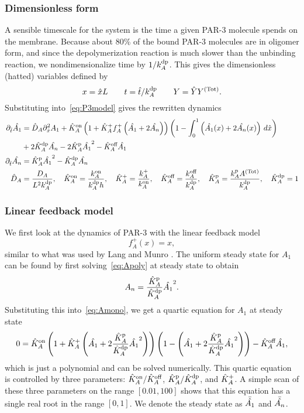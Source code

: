 \documentclass[11pt]{article}
\newcommand{\6}[1]{#1_{\text{6}}}
\newcommand{\3}[1]{#1_{\text{3}}}
\newcommand{\Tot}[1]{#1^\text{(Tot)}}
\newcommand{\A}[1]{#1_A}
\begin{document}
\subsubsection{Dimensionless form}
A sensible timescale for the system is the time a given PAR-3 molecule spends on the membrane. Because about 80\% of the bound PAR-3 molecules are in oligomer form, and since the depolymerization reaction is much slower than the unbinding reaction, we nondimensionalize time by $1/\A{\kdp}$. This gives the dimensionless (hatted) variables defined by
\begin{equation*}
x = \hat{x} L \qquad t= \hat{t}/\A{\kdp} \qquad Y= \hat{Y}\Tot{Y}.
\end{equation*}
Substituting into\ \eqref{eq:P3model} gives the rewritten dynamics
\begin{subequations}
\label{eq:PAR3gen}
\begin{align}
\nonumber
\Dthat \hat{\MA} & = \DhatA \Dxhat^2 \MA +\KhatonA \left(1+\KhatfA \A{f}^+\left(\hat{\MA}+2\hat{\PA}\right)\right)\left(1 - \int_0^1 \left(\hat{\MA}(x) + 2\hat{\PA}(x)\right) \, d\hat{x} \right) \\ 
\label{eq:Amono} &+ 2\KhatdpA \hat{\PA}-2\KhatpA \hat{\MA}^2 - \KhatoffA \hat{\MA} \\
\label{eq:Apoly}
\Dthat \hat{\PA} & =\KhatpA \hat{\MA}^2- \KhatdpA \hat{\PA} \\ 
\label{eq:paramsND}
\DhatA &=\frac{\A{D}}{L^2 \A{\kdp}}, \quad \KhatonA=\frac{\A{\kon}}{\A{\kdp} h }, \quad \KhatfA = \frac{\A{\kf}}{\A{\kon}}, \quad  \KhatoffA = \frac{\A{\koff}}{\A{\kdp}}, \quad \KhatpA = \frac{\A{\kp} \Tot{A}}{\A{\kdp}}, \quad \KhatdpA=1
\end{align}
\end{subequations}

\subsubsection{Linear feedback model}
We first look at the dynamics of PAR-3 with the linear feedback model $$f_A^+(x)=x,$$ similar to what was used by Lang and Munro \cite{lang2022oligomerization}. The uniform steady state for $A_1$ can be found by first solving\ \eqref{eq:Apoly} at steady state to obtain
\begin{equation}
	A_n = \frac{\hat{K}^\text{p}_A}{\hat{K}^\text{dp}_A} \hat{A_1}^2.
\end{equation}
Substituting this into\ \eqref{eq:Amono}, we get a quartic equation for $A_1$ at steady state
\begin{equation}
\nonumber
0 =\hat{K}^\text{on}_A \left(1+\hat{K}^\text{+}_A \left(\hat{A_1}+2\frac{\hat{K}^\text{p}_A}{\hat{K}^\text{dp}_A} \hat{A_1}^2\right)\right)\left(1 - \left(\hat{A_1} + 2\frac{\hat{K}^\text{p}_A}{\hat{K}^\text{dp}_A} \hat{A_1}^2\right)\right)  - \hat{K}^\text{off}_A \hat{A_1},
\end{equation}
which is just a polynomial and can be solved numerically. This quartic equation is controlled by three parameters: $\hat{K}^\text{on}_A/\hat{K}^\text{off}_A$, $\hat{K}^\text{p}_A/\hat{K}^\text{dp}_A$, and $\hat{K}^\text{+}_A$. A simple scan of these three parameters on the range $[0.01,100]$ shows that this equation has a single real root in the range $[0,1]$. We denote the steady state as $\bar{\hat{A_1}}$ and $\bar{\hat{A_n}}$.
\end{document}
